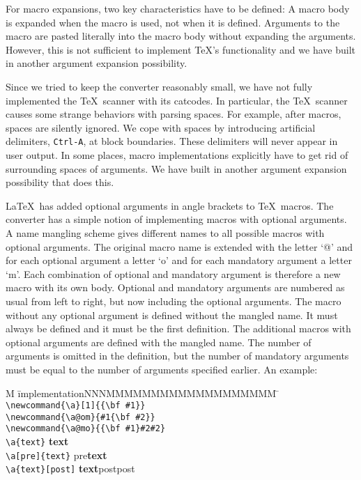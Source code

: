 \documentclass[11pt]{article}
\newcommand{\Dindex}[1]{#1\index{#1}}
\begin{document}
For macro expansions, two key characteristics have to be defined: A
macro body is expanded when the macro is used, not when it is defined.
Arguments to the macro are pasted literally into the macro body
without expanding the arguments. However, this is not sufficient to
implement \TeX's functionality and we have built in another argument
expansion possibility.

Since we tried to keep the converter reasonably small, we have not
fully implemented the \TeX\ scanner with its catcodes.
In particular, the \TeX\ scanner causes some strange behaviors with
\Dindex{parsing} spaces.
For example, after macros, spaces are silently ignored. We cope with
spaces by introducing artificial delimiters, {\tt Ctrl-A}, at block
boundaries. These delimiters will never appear in user output. In some
places, macro implementations explicitly have to get rid of
surrounding spaces of arguments. We have built in another argument
expansion possibility that does this.

\LaTeX\ has added optional arguments in angle brackets to \TeX\ 
macros. The converter has a simple notion of implementing macros with
optional arguments. A name mangling scheme gives different names to
all possible macros with optional arguments. The original macro name
is extended with the letter `@' and for each optional argument a
letter `o' and for each mandatory argument a letter `m'. Each
combination of optional and mandatory argument is therefore a new
macro with its own body. Optional and mandatory arguments are numbered
as usual from left to right, but now including the optional arguments.
The macro without any optional argument is defined without the mangled
name. It must always be defined and it must be the first definition.
The additional macros with optional arguments are defined with the
mangled name. The number of arguments is omitted in the definition,
but the number of mandatory arguments must be equal to the number of
arguments specified earlier. An example:
\index{arguments, macro}

\begin{tabbing}
  M \= implementationNNNMMMMMMMMMMMMMMMMMMM \= \kill
  \> \verb+\newcommand{\a}[1]{{\bf #1}}+ \\
  \> \verb+\newcommand{\a@om}{#1{\bf #2}}+ \\
  \> \verb+\newcommand{\a@mo}{{\bf #1}#2#2}+ \\
  \> \verb+\a{text}+         \> {\bf text}\\
  \> \verb+\a[pre]{text}+    \> pre{\bf text}\\
  \> \verb+\a{text}[post]+   \> {\bf text}postpost
\end{tabbing}
\end{document}
